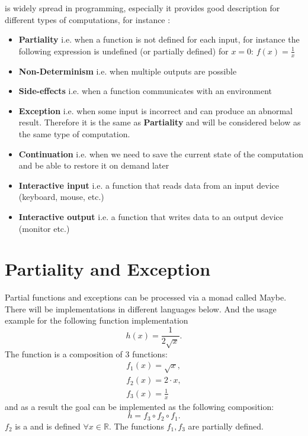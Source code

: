  is widely spread in programming,
especially it provides good description for different types of
computations, for instance \cite{bib:Moggi91, bib:milewski2018category}:
\begin{itemize}
\item \textbf{Partiality} i.e. when a function is not defined for each input, for
  instance the following expression is undefined (or partially
  defined) for $x = 0$: $f(x) = \frac{1}{x}$
\item \textbf{Non-Determinism} i.e. when multiple outputs are possible
\item \textbf{Side-effects} i.e. when a function communicates with
  an environment
\item \textbf{Exception} i.e. when some input is incorrect and can
  produce an abnormal result. Therefore it is the same as
  \textbf{Partiality} and will be considered below as the same type of
  computation. 
\item \textbf{Continuation} i.e. when we need to save the current
  state of the computation and be able to restore it on demand later
\item \textbf{Interactive input} i.e. a function that reads data from
  an input device (keyboard, mouse, etc.)
\item \textbf{Interactive output} i.e. a function that writes data to
an output device (monitor etc.)
\end{itemize}

\section{Partiality and Exception}

Partial functions and exceptions can be processed via a monad called
Maybe. There will be implementations in different languages below.
And the usage example for the following function implementation
\[
h(x) = \frac{1}{2 \sqrt{x}}.
\]
The function is a composition of 3 functions:
\begin{eqnarray}
f_1(x) = \sqrt{x},
\nonumber \\
f_2(x) = 2 \cdot x,
\nonumber \\
f_3(x) = \frac{1}{x}
\label{eq:monadmaybe_ex_f}
\end{eqnarray}
and as a result the goal can be implemented as the following
composition:
\begin{equation}
h = f_3 \circ f_2 \circ f_1.
\label{eq:monadmaybe_ex_h}
\end{equation}
$f_2$ is a  and is defined $\forall x \in \mathbb{R}$. The
functions $f_1, f_3$ are partially defined.

